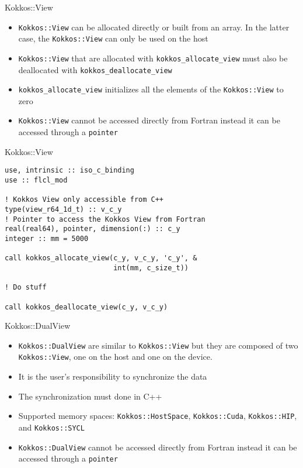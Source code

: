 \begin{frame}{Kokkos::View}
  \begin{itemize}
    \item \texttt{Kokkos::View} can be allocated directly or built from an
      array. In the latter case, the \texttt{Kokkos::View} can only be used on
      the host %
    \item \texttt{Kokkos::View} that are allocated with
      \texttt{kokkos\_allocate\_view} must also be deallocated with
      \texttt{kokkos\_deallocate\_view}
    \item \texttt{kokkos\_allocate\_view} initializes all the elements of the
      \texttt{Kokkos::View} to zero
    \item \texttt{Kokkos::View} cannot be accessed directly from Fortran instead
      it can be accessed through a \texttt{pointer}
  \end{itemize}
\end{frame}

\begin{frame}[containsverbatim]{Kokkos::View}
  \begin{verbatim}
use, intrinsic :: iso_c_binding
use :: flcl_mod

! Kokkos View only accessible from C++
type(view_r64_1d_t) :: v_c_y
! Pointer to access the Kokkos View from Fortran
real(real64), pointer, dimension(:) :: c_y
integer :: mm = 5000

call kokkos_allocate_view(c_y, v_c_y, 'c_y', &
                          int(mm, c_size_t))

! Do stuff

call kokkos_deallocate_view(c_y, v_c_y)
  \end{verbatim}
\end{frame}

\begin{frame}{Kokkos::DualView}
  \begin{itemize}
    \item \texttt{Kokkos::DualView} are similar to \texttt{Kokkos::View} but
      they are composed of two \texttt{Kokkos::View}, one on the host and one on
      the device.
    \item It is the user's responsibility to synchronize the data
    \item The synchronization must done in C++
    \item Supported memory spaces: \texttt{Kokkos::HostSpace},
      \texttt{Kokkos::Cuda}, \texttt{Kokkos::HIP}, and \texttt{Kokkos::SYCL}
    \item \texttt{Kokkos::DualView} cannot be accessed directly from Fortran instead
      it can be accessed through a \texttt{pointer}
  \end{itemize}
\end{frame}

